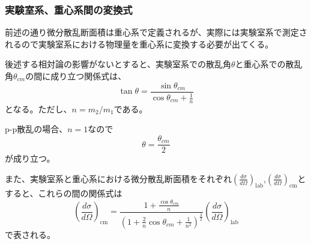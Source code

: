 \documentclass[a4paper,11pt,dvipdfmx]{jsarticle}
\begin{document}
\subsubsection{実験室系、重心系間の変換式}
前述の通り微分散乱断面積は重心系で定義されるが、実際には実験室系で測定されるので実験室系における物理量を重心系に変換する必要が出てくる。

後述する相対論の影響がないとすると、実験室系での散乱角$\theta$と重心系での散乱角$\theta_{cm}$の間に成り立つ関係式は、
\begin{equation}
    \tan\theta = \frac{\sin\theta_{cm}}{\cos\theta_{cm}+\frac{1}{n}}\label{eq:henkan1}
\end{equation}
となる\cite{kyodai}。ただし、$n=m_{2}/m_{1}$である。

p-p散乱の場合、$n=1$なので
\begin{equation}
    \theta=\frac{\theta_{cm}}{2}
\end{equation}
が成り立つ。

また、実験室系と重心系における微分散乱断面積をそれぞれ$\left(\frac{d\sigma}{d\Omega}\right)_\text{lab}$,$\left(\frac{d\sigma}{d\Omega}\right)_\text{cm}$とすると、これらの間の関係式は
\begin{equation}
    \left(\frac{d\sigma}{d\Omega}\right)_\text{cm} = \frac{1+\frac{\cos\theta_{cm}}{n}}{\left(1+\frac{2}{n}\cos\theta_{cm}+\frac{1}{n^2}\right)^{\frac{3}{2}}}\left(\frac{d\sigma}{d\Omega}\right)_\text{lab}\label{eq:henkan2}
\end{equation}
で表される\cite{kyodai}。
\end{document}
